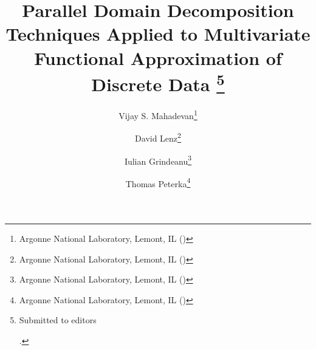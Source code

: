 \documentclass[review,hidelinks,onefignum,onetabnum]{siamart220329}
\begin{document}
%
\newcommand\relatedversion{}
\renewcommand\relatedversion{\thanks{The full version of the paper can be accessed at \protect\url{https://arxiv.org/abs/1902.09310}}} %



\title{Parallel Domain Decomposition Techniques Applied to Multivariate Functional Approximation of Discrete Data
\thanks{Submitted to editors \date{}.
}
}

\author{Vijay S. Mahadevan\thanks{Argonne National Laboratory, Lemont, IL ()} 
\and
David Lenz\thanks{Argonne National Laboratory, Lemont, IL ()}
\and
Iulian Grindeanu\thanks{Argonne National Laboratory, Lemont, IL ()}
\and
Thomas Peterka\thanks{Argonne National Laboratory, Lemont, IL  ()}
}


\date{}


\maketitle








%










%






\end{document}
